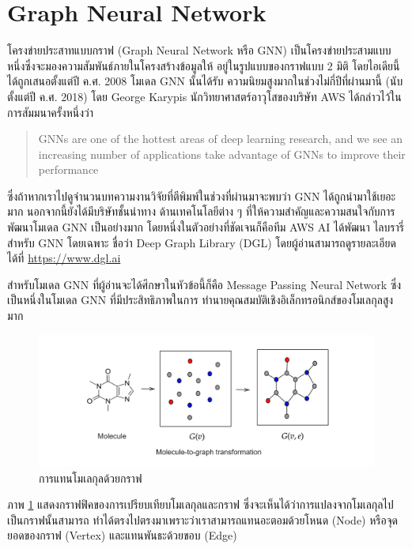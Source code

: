 \section{Graph Neural Network}
\label{sec:gnn}

โครงข่ายประสาทแบบกราฟ (Graph Neural Network หรือ GNN) เป็นโครงข่ายประสามแบบหนึ่งซึ่งจะมองความสัมพันธ์ภายในโครงสร้างข้อมูลให้%
อยู่ในรูปแบบของกราฟแบบ 2 มิติ โดยไอเดียนี้ได้ถูกเสนอตั้งแต่ปี ค.ศ. 2008\autocite{scarselli2009,zhou2020} โมเดล GNN นั้นได้รับ%
ความนิยมสูงมากในช่วงไม่กี่ปีที่ผ่านมานี้ (นับตั้งแต่ปี ค.ศ. 2018) โดย George Karypis นักวิทยาศาสตร์อาวุโสของบริษัท AWS ได้กล่าวไว้ใน%
การสัมมนาครั้งหนึ่งว่า 

\blockquote{GNNs are one of the hottest areas of deep learning research, and we see an increasing number of 
applications take advantage of GNNs to improve their performance}

\noindent ซึ่งถ้าหากเราไปดูจำนวนบทความงานวิจัยที่ตีพิมพ์ในช่วงที่ผ่านมาจะพบว่า GNN ได้ถูกนำมาใช้เยอะมาก นอกจากนี้ยังได้มีบริษัทชั้นนำทาง%
ด้านเทคโนโลยีต่าง ๆ ที่ให้ความสำคัญและความสนใจกับการพัฒนาโมเดล GNN เป็นอย่างมาก โดยหนึ่งในตัวอย่างที่ชัดเจนก็คือทีม AWS AI ได้พัฒนา%
ไลบรารี่สำหรับ GNN โดยเฉพาะ ชื่อว่า Deep Graph Library (DGL) โดยผู้อ่านสามารถดูรายละเอียดได้ที่ \url{https://www.dgl.ai}

สำหรับโมเดล GNN ที่ผู้อ่านจะได้ศึกษาในหัวข้อนี้ก็คือ Message Passing Neural Network ซึ่งเป็นหนึ่งในโมเดล GNN ที่มีประสิทธิภาพในการ%
ทำนายคุณสมบัติเชิงอิเล็กทรอนิกส์ของโมเลกุลสูงมาก

\begin{figure}[htbp]
    \centering
    \includegraphics[width=\linewidth]{fig/mol-2-graph.png}
    \caption{การแทนโมเลกุลด้วยกราฟ}
    \label{fig:mol_2_graph}
\end{figure}

ภาพ \ref{fig:mol_2_graph} แสดงกราฟฟิคของการเปรียบเทียบโมเลกุลและกราฟ ซึ่งจะเห็นได้ว่าการแปลงจากโมเลกุลไปเป็นกราฟนั้นสามารถ%
ทำได้ตรงไปตรงมาเพราะว่าเราสามารถแทนอะตอมด้วยโหนด (Node) หรือจุดยอดของกราฟ (Vertex) และแทนพันธะด้วยขอบ (Edge)

